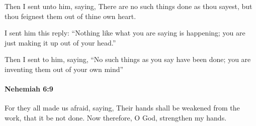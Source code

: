 			\begin{versebox}
					\item[BHS] 
					\item[LXX] 
					\item[ASV] Then I sent unto him, saying, There are no such things done as thou sayest, but thou feignest them out of thine own heart.
					\item[NIV] I sent him this reply: “Nothing like what you are saying is happening; you are just making it up out of your head.”
					\item[NRSV] Then I sent to him, saying, “No such things as you say have been done; you are inventing them out of your own mind”
			\end{versebox}

		\paragraph{Nehemiah 6:9} %
			\label{NEHEMIAH-6-9}

			For they all made us afraid, saying, Their hands shall be weakened from the work, that it be not done. Now therefore, O God, strengthen my hands.

